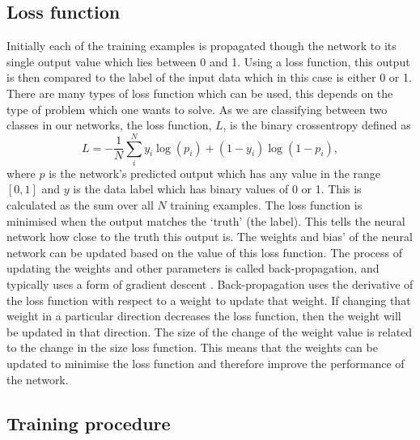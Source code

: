 \subsection{Loss function}

%
Initially each of the training examples is propagated though the network to its single output value which lies between 0 and 1. Using a loss function, this output is then compared to
the label of the input data which in this case is either 0 or 1. There are many types of loss function which can be used, this depends on the type of problem which one wants to solve. As we are classifying
between two classes in our networks, the loss function, $L$, is the binary
crossentropy defined as
%
\begin{equation}\label{cnn:loss} 
L = -\frac{1}{N} \sum_{i}^{N} y_i\log{(p_i)} + (1-y_i)\log{(1-p_i)},
\end{equation}
%
where $p$ is the network's predicted output which has any value in the range $[0,1]$ and $y$ is the data label which has binary values of 0 or 1. This is calculated as the sum over all $N$ training examples. 
The loss function is minimised when the output matches the `truth' (the label). This
tells the neural network how close to the truth this output is. The weights and bias' of
the neural network can be updated based on the value of this loss function. The
process of updating the weights and other parameters is called back-propagation,
and typically uses a form of gradient descent
\cite{kingma2015AdamMethod}.
Back-propagation uses the derivative of the loss function with respect to a weight to update that weight.
If changing that weight in a particular direction decreases the loss function, then the weight will be updated in that direction.
The size of the change of the weight value is related to the change in the size loss function.
This means that the weights can be updated to minimise the loss function and therefore improve the performance of the network.

\subsection{Training procedure}

